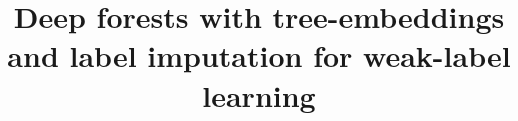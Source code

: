 \documentclass[conference,compsoc]{IEEEtran}
\begin{document}
%
\title{Deep forests with tree-embeddings and label imputation for weak-label learning}


\end{document}
